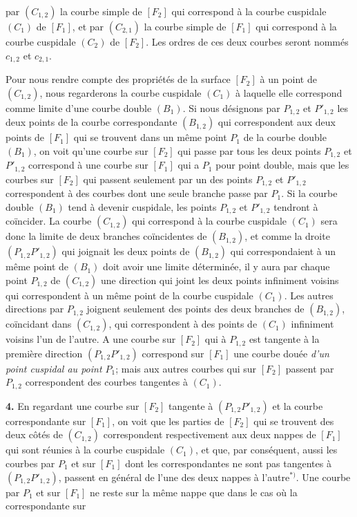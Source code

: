 \documentclass{article}
\begin{document}
par $(C_{1, 2})$ la courbe simple de $[F_2]$ qui correspond à la courbe cuspidale $(C_1)$ de $[F_1]$, et par $(C_{2, 1})$ la courbe simple de $[F_1]$ qui correspond à la courbe cuspidale $(C_2)$ de $[F_2]$. Les ordres de ces deux courbes seront nommés $c_{1, 2}$ et $c_{2, 1}$.

Pour nous rendre compte des propriétés de la surface $[F_2]$ à un point de $(C_{1, 2})$, nous regarderons la courbe cuspidale $(C_1)$ à laquelle elle correspond comme limite d'une courbe double $(B_1)$. Si nous désignons par $P_{1, 2}$ et $P'_{1, 2}$ les deux points de la courbe correspondante $(B_{1, 2})$ qui correspondent aux deux points de $[F_1]$ qui se trouvent dans un même point $P_1$ de la courbe double $(B_1)$, on voit qu'une courbe sur $[F_2]$ qui passe par tous les deux points $P_{1, 2}$ et $P'_{1, 2}$ correspond à une courbe sur $[F_1]$ qui a $P_1$ pour point double, mais que les courbes sur $[F_2]$ qui passent seulement par un des points $P_{1, 2}$ et $P'_{1, 2}$ correspondent à des courbes dont une seule branche passe par $P_1$. Si la courbe double $(B_1)$ tend à devenir cuspidale, les points $P_{1, 2}$ et $P'_{1, 2}$ tendront à coïncider. La courbe $(C_{1, 2})$ qui correspond à la courbe cuspidale $(C_1)$ sera donc la limite de deux branches coïncidentes de $(B_{1, 2})$, et comme la droite $(P_{1, 2} P'_{1, 2})$ qui joignait les deux points de $(B_{1, 2})$ qui correspondaient à un même point de $(B_1)$ doit avoir une limite déterminée, il y aura par chaque point $P_{1, 2}$ de $(C_{1, 2})$ une direction qui joint les deux points infiniment voisins qui correspondent à un même point de la courbe cuspidale $(C_1)$. Les autres directions par $P_{1, 2}$ joignent seulement des points des deux branches de $(B_{1, 2})$, coïncidant dans $(C_{1, 2})$, qui correspondent à des points de $(C_1)$ infiniment voisins l'un de l'autre. A une courbe sur $[F_2]$ qui à $P_{1, 2}$ est tangente à la première direction $(P_{1, 2} P'_{1, 2})$ correspond sur $[F_1]$ une courbe douée \emph{d'un point cuspidal au point $P_1$}; mais aux autres courbes qui sur $[F_2]$ passent par $P_{1, 2}$ correspondent des courbes tangentes à $(C_1)$.

\textbf{4.} En regardant une courbe sur $[F_2]$ tangente à $(P_{1, 2} P'_{1, 2})$ et la courbe correspondante sur $[F_1]$, on voit que les parties de $[F_2]$ qui se trouvent des deux côtés de $(C_{1, 2})$ correspondent respectivement aux deux nappes de $[F_1]$ qui sont réunies à la courbe cuspidale $(C_1)$, et que, par conséquent, aussi les courbes par $P_1$ et sur $[F_1]$ dont les correspondantes ne sont pas tangentes à $(P_{1, 2} P'_{1, 2})$, passent en général de l'une des deux nappes à l'autre${}^{*)}$. Une courbe par $P_1$ et sur $[F_1]$ ne reste sur la même nappe que dans le cas où la correspondante sur
\end{document}
